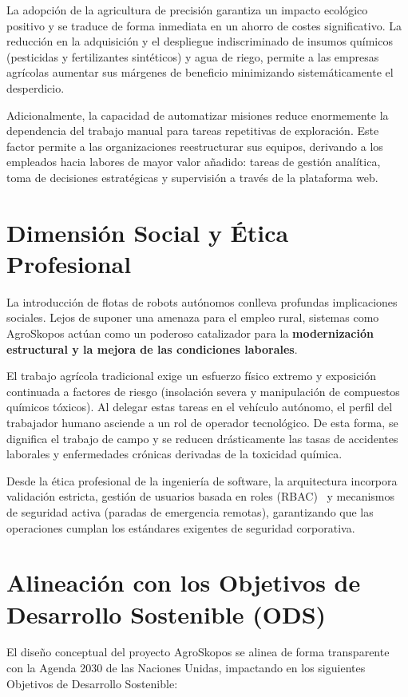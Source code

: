 La adopción de la agricultura de precisión garantiza un impacto ecológico positivo y se traduce de forma inmediata en un ahorro de costes significativo. La reducción en la adquisición y el despliegue indiscriminado de insumos químicos (pesticidas y fertilizantes sintéticos) y agua de riego, permite a las empresas agrícolas aumentar sus márgenes de beneficio minimizando sistemáticamente el desperdicio.

Adicionalmente, la capacidad de automatizar misiones reduce enormemente la dependencia del trabajo manual para tareas repetitivas de exploración. Este factor permite a las organizaciones reestructurar sus equipos, derivando a los empleados hacia labores de mayor valor añadido: tareas de gestión analítica, toma de decisiones estratégicas y supervisión a través de la plataforma web.

\section{Dimensión Social y Ética Profesional}
La introducción de flotas de robots autónomos conlleva profundas implicaciones sociales. Lejos de suponer una amenaza para el empleo rural, sistemas como AgroSkopos actúan como un poderoso catalizador para la \textbf{modernización estructural y la mejora de las condiciones laborales}.

El trabajo agrícola tradicional exige un esfuerzo físico extremo y exposición continuada a factores de riesgo (insolación severa y manipulación de compuestos químicos tóxicos). Al delegar estas tareas en el vehículo autónomo, el perfil del trabajador humano asciende a un rol de operador tecnológico. De esta forma, se dignifica el trabajo de campo y se reducen drásticamente las tasas de accidentes laborales y enfermedades crónicas derivadas de la toxicidad química.

Desde la ética profesional de la ingeniería de software, la arquitectura incorpora validación estricta, gestión de usuarios basada en roles (RBAC)~\cite{rbac} y mecanismos de seguridad activa (paradas de emergencia remotas), garantizando que las operaciones cumplan los estándares exigentes de seguridad corporativa.

\section{Alineación con los Objetivos de Desarrollo Sostenible (ODS)}
El diseño conceptual del proyecto AgroSkopos se alinea de forma transparente con la Agenda 2030 de las Naciones Unidas, impactando en los siguientes Objetivos de Desarrollo Sostenible:

